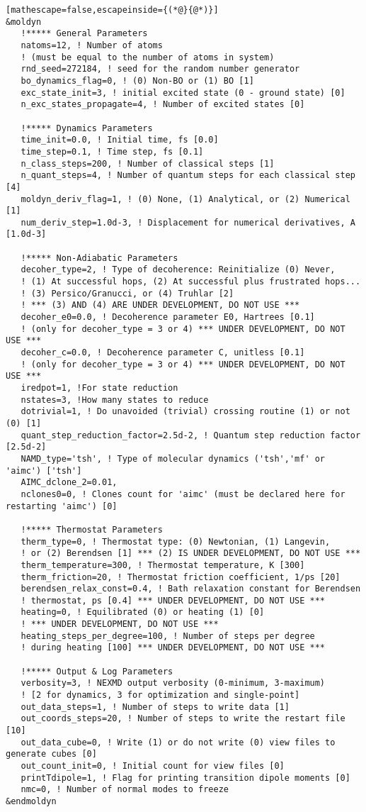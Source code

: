\begin{lstlisting}[mathescape=false,escapeinside={(*@}{@*)}]
&moldyn
   !***** General Parameters
   natoms=12, ! Number of atoms
   ! (must be equal to the number of atoms in system)
   rnd_seed=272184, ! seed for the random number generator
   bo_dynamics_flag=0, ! (0) Non-BO or (1) BO [1]
   exc_state_init=3, ! initial excited state (0 - ground state) [0]
   n_exc_states_propagate=4, ! Number of excited states [0]

   !***** Dynamics Parameters
   time_init=0.0, ! Initial time, fs [0.0]
   time_step=0.1, ! Time step, fs [0.1]
   n_class_steps=200, ! Number of classical steps [1]
   n_quant_steps=4, ! Number of quantum steps for each classical step [4]
   moldyn_deriv_flag=1, ! (0) None, (1) Analytical, or (2) Numerical [1]
   num_deriv_step=1.0d-3, ! Displacement for numerical derivatives, A [1.0d-3]

   !***** Non-Adiabatic Parameters
   decoher_type=2, ! Type of decoherence: Reinitialize (0) Never,
   ! (1) At successful hops, (2) At successful plus frustrated hops...
   ! (3) Persico/Granucci, or (4) Truhlar [2]
   ! *** (3) AND (4) ARE UNDER DEVELOPMENT, DO NOT USE ***
   decoher_e0=0.0, ! Decoherence parameter E0, Hartrees [0.1]
   ! (only for decoher_type = 3 or 4) *** UNDER DEVELOPMENT, DO NOT USE ***
   decoher_c=0.0, ! Decoherence parameter C, unitless [0.1]
   ! (only for decoher_type = 3 or 4) *** UNDER DEVELOPMENT, DO NOT USE ***
   iredpot=1, !For state reduction
   nstates=3, !How many states to reduce
   dotrivial=1, ! Do unavoided (trivial) crossing routine (1) or not (0) [1]
   quant_step_reduction_factor=2.5d-2, ! Quantum step reduction factor [2.5d-2]
   NAMD_type='tsh', ! Type of molecular dynamics ('tsh','mf' or 'aimc') ['tsh']
   AIMC_dclone_2=0.01,
   nclones0=0, ! Clones count for 'aimc' (must be declared here for restarting 'aimc') [0]

   !***** Thermostat Parameters
   therm_type=0, ! Thermostat type: (0) Newtonian, (1) Langevin,
   ! or (2) Berendsen [1] *** (2) IS UNDER DEVELOPMENT, DO NOT USE ***
   therm_temperature=300, ! Thermostat temperature, K [300]
   therm_friction=20, ! Thermostat friction coefficient, 1/ps [20]
   berendsen_relax_const=0.4, ! Bath relaxation constant for Berendsen
   ! thermostat, ps [0.4] *** UNDER DEVELOPMENT, DO NOT USE ***
   heating=0, ! Equilibrated (0) or heating (1) [0]
   ! *** UNDER DEVELOPMENT, DO NOT USE ***
   heating_steps_per_degree=100, ! Number of steps per degree
   ! during heating [100] *** UNDER DEVELOPMENT, DO NOT USE ***

   !***** Output & Log Parameters
   verbosity=3, ! NEXMD output verbosity (0-minimum, 3-maximum)
   ! [2 for dynamics, 3 for optimization and single-point]
   out_data_steps=1, ! Number of steps to write data [1]
   out_coords_steps=20, ! Number of steps to write the restart file [10]
   out_data_cube=0, ! Write (1) or do not write (0) view files to generate cubes [0]
   out_count_init=0, ! Initial count for view files [0]
   printTdipole=1, ! Flag for printing transition dipole moments [0]
   nmc=0, ! Number of normal modes to freeze
&endmoldyn


\end{lstlisting}
